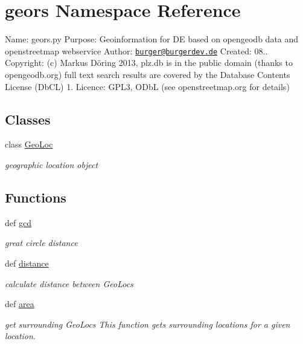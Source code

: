 \hypertarget{namespacegeors}{\section{geors Namespace Reference}
\label{namespacegeors}
}


Name\-: geors.\-py Purpose\-: Geoinformation for D\-E based on opengeodb data and openstreetmap webservice Author\-: \href{mailto:burger@burgerdev.de}{\tt burger@burgerdev.\-de} Created\-: 08.. Copyright\-: (c) Markus Döring 2013, plz.\-db is in the public domain (thanks to opengeodb.\-org) full text search results are covered by the Database Contents License (Db\-C\-L) 1. Licence\-: G\-P\-L3, O\-Db\-L (see openstreetmap.\-org for details)  


\subsection*{Classes}
\begin{DoxyCompactItemize}
\item 
class \hyperlink{classgeors_1_1GeoLoc}{Geo\-Loc}
\begin{DoxyCompactList}\small\item\em geographic location object \end{DoxyCompactList}\end{DoxyCompactItemize}
\subsection*{Functions}
\begin{DoxyCompactItemize}
\item 
def \hyperlink{namespacegeors_a524e72573297cfd02214f0ee5c416330}{gcd}
\begin{DoxyCompactList}\small\item\em great circle distance \end{DoxyCompactList}\item 
def \hyperlink{namespacegeors_a250a82f910c096532544fbe6b5a3f808}{distance}
\begin{DoxyCompactList}\small\item\em calculate distance between Geo\-Locs \end{DoxyCompactList}\item 
def \hyperlink{namespacegeors_abf605583f4b44d3ade8ac9a0a9da63d1}{area}
\begin{DoxyCompactList}\small\item\em get surrounding Geo\-Locs This function gets surrounding locations for a given location. \end{DoxyCompactList}\end{DoxyCompactItemize}
